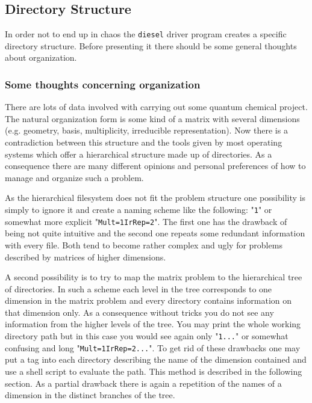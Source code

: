 \subsection{Directory Structure}
In order not to end up in chaos the {\tt diesel} driver program creates
a specific directory structure. Before presenting it there should be
some general thoughts about organization.

\subsubsection{Some thoughts concerning organization}  

There are lots of data involved with carrying out some quantum chemical
project. The natural organization form is some kind of a matrix with several 
dimensions (e.g. geometry, basis, multiplicity, irreducible representation).
Now there is a contradiction between this structure
and the tools given by most operating systems which offer a hierarchical
structure made up of directories. As a consequence there are many different
opinions and personal preferences of how to manage and organize such a problem.

As the hierarchical filesystem does not fit the problem structure one 
possibility is simply to ignore it and create a naming scheme like the
following: "{\tt 1}" or somewhat more explicit "{\tt Mult=1\ub IrRep=2}".
The first one has the drawback of being not quite intuitive and the second one
repeats some redundant information with every file. Both tend to become rather
complex and ugly for problems described by matrices of higher dimensions.

A second possibility is to try to map the matrix problem to the hierarchical
tree of directories. In such a scheme each level in the tree corresponds to one
dimension in the matrix problem and every directory contains information on
that dimension only. As a consequence without tricks you do not see any
information from the higher levels of the tree. You may print the whole working
directory path but in this case you would see again only "{\tt 1...}" or
somewhat confusing and long  "{\tt Mult=1\ub IrRep=2...}". To get rid of these
drawbacks one may put a tag into each directory describing the name of the
dimension contained and use a shell script to evaluate the path.  This method
is described in the following section. As a
partial drawback there is again a repetition of the names of a dimension in the
distinct branches of the tree.


